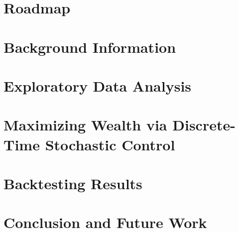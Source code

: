 \documentclass{beamer}
\begin{document}
    \maketitle
    \addtocounter{framenumber}{-2}
    \section*{Roadmap}
    
    {
	\makeatletter {} \makeatother
    }

    \section{Background Information}
    
    
    \section{Exploratory Data Analysis}
    
    
    
    \section{Maximizing Wealth via Discrete-Time Stochastic Control}
    

    \section{Backtesting Results}
    
    
    \section{Conclusion and Future Work}
    
    
    \section*{}
    
    
\end{document}
